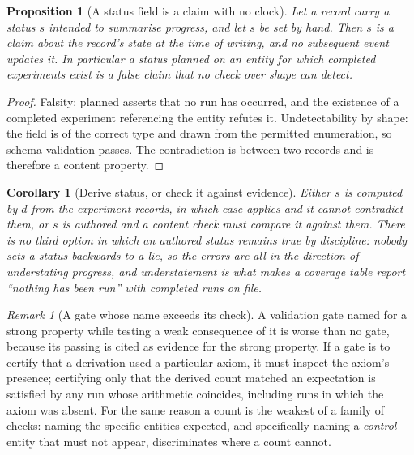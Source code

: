 \documentclass[11pt,a4paper]{article}
\theoremstyle{plain}
\newtheorem{proposition}[theorem]{Proposition}
\newtheorem{corollary}[theorem]{Corollary}
\theoremstyle{definition}
\theoremstyle{remark}
\newtheorem{remark}[theorem]{Remark}
\begin{document}
\begin{proposition}[A status field is a claim with no clock]
\label{prop:status-clock}
Let a record carry a status $s$ intended to summarise progress, and let $s$ be
set by hand. Then $s$ is a claim about the record's state at the time of
writing, and no subsequent event updates it. In particular a status
\textsf{planned} on an entity for which completed experiments exist is a false
claim that no check over shape can detect.
\end{proposition}

\begin{proof}
Falsity: \textsf{planned} asserts that no run has occurred, and the existence
of a completed experiment referencing the entity refutes it. Undetectability by
shape: the field is of the correct type and drawn from the permitted
enumeration, so schema validation passes. The contradiction is between two
records and is therefore a content property.
\end{proof}

\begin{corollary}[Derive status, or check it against evidence]
\label{cor:derive-status}
Either $s$ is computed by $d$ from the experiment records, in which case
 applies and it cannot contradict them, or $s$ is authored
and a content check must compare it against them. There is no third option in
which an authored status remains true by discipline: nobody sets a status
backwards to a lie, so the errors are all in the direction of understating
progress, and understatement is what makes a coverage table report ``nothing
has been run'' with completed runs on file.
\end{corollary}

\begin{remark}[A gate whose name exceeds its check]
\label{rem:gate-name}
A validation gate named for a strong property while testing a weak consequence
of it is worse than no gate, because its passing is cited as evidence for the
strong property. If a gate is to certify that a derivation used a particular
axiom, it must inspect the axiom's presence; certifying only that the derived
count matched an expectation is satisfied by any run whose arithmetic
coincides, including runs in which the axiom was absent. For the same reason a
count is the weakest of a family of checks: naming the specific entities
expected, and specifically naming a \emph{control} entity that must not appear,
discriminates where a count cannot.
\end{remark}
\end{document}
